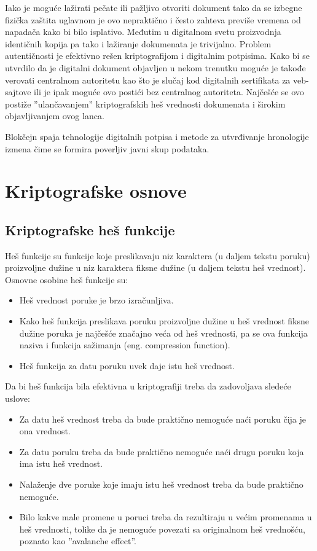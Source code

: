 \documentclass[a4paper]{article}
\begin{document}
Iako je moguće lažirati pečate ili pažljivo otvoriti dokument tako da se izbegne fizička zaštita
uglavnom je ovo nepraktično i često zahteva previše vremena od napadača kako bi bilo isplativo.
Međutim u digitalnom svetu proizvodnja identičnih kopija pa tako i lažiranje dokumenata je trivijalno.
Problem autentičnosti je efektivno rešen kriptografijom i digitalnim potpisima.
Kako bi se utvrdilo da je digitalni dokument objavljen u nekom trenutku moguće je takođe verovati
centralnom autoritetu kao što je slučaj kod digitalnih sertifikata za veb-sajtove ili je ipak moguće
ovo postići bez centralnog autoriteta. Najčešće se ovo postiže ''ulančavanjem'' kriptografskih heš vrednosti
dokumenata i širokim objavljivanjem ovog lanca.

Blokčejn spaja tehnologije digitalnih potpisa i metode za utvrđivanje hronologije izmena čime
se formira poverljiv javni skup podataka.

\section{Kriptografske osnove}	
\label{sec:kriptografske_osnove}

\subsection{Kriptografske heš funkcije}
Heš funkcije su funkcije koje preslikavaju niz karaktera (u daljem tekstu poruku) proizvoljne dužine u niz karaktera fiksne dužine (u daljem tekstu heš vrednost). Osnovne osobine heš funkcije su:
\begin{itemize}
\item Heš vrednost poruke je brzo izračunljiva.
\item Kako heš funkcija preslikava poruku proizvoljne dužine u heš vrednost fiksne dužine poruka je najčešće značajno veća od heš vrednosti, pa se ova funkcija naziva i funkcija sažimanja (eng. compression function).
\item Heš funkcija za datu poruku uvek daje istu heš vrednost.
\end{itemize}

Da bi heš funkcija bila efektivna u kriptografiji treba da zadovoljava sledeće uslove:
\begin{itemize}
\item Za datu heš vrednost treba da bude praktično nemoguće naći poruku čija je ona vrednost.
\item Za datu poruku treba da bude praktično nemoguće naći drugu poruku koja ima istu heš vrednost.
\item Nalaženje dve poruke koje imaju istu heš vrednost treba da bude praktično nemoguće. 
\item Bilo kakve male promene u poruci treba da rezultiraju u većim promenama u heš vrednosti, tolike da je nemoguće povezati sa originalnom heš vrednošću, poznato kao ''avalanche effect''.
\end{itemize}
\end{document}
